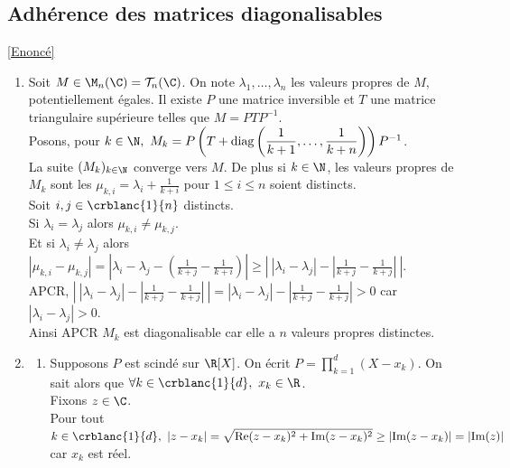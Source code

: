 \documentclass{book}
\begin{document}
	\subsection{Adhérence des matrices diagonalisables }
	\label{sec:adherence-des-matrices-diagonalisables-etoile3}
	\textcolor{blue}{\hyperref[Adhérence des matrices diagonalisables]{[Enoncé]}}\\
	\begin{enumerate}[leftmargin=*]
		\item Soit $M\in \M_n(\C)=\mathcal{T}_n(\C)$. On note $\lambda_1,\dots,\lambda_n$ les valeurs propres de $M$, potentiellement égales. Il existe $P$ une matrice inversible et $T$ une matrice triangulaire supérieure telles que $M=PTP^{-1}$.\\
		Posons, pour $k\in \N,\ M_k=P\left(T+\text{diag}\left(\displaystyle\frac{1}{k+1},\dots,\frac{1}{k+n}\right)\right)P^{-1}$.\\
		La suite $(M_k)_{k\in \N}$ converge vers $M$. De plus si $k\in \N$, les valeurs propres de $M_k$ sont les $\mu_{k,i}=\lambda_i+\displaystyle\frac{1}{k+i}$ pour $1\leq i\leq n$ soient distincts.\\
		Soit $i,j\in \crblanc{1}{n}$ distincts.\\
		Si $\lambda_i=\lambda_j$ alors $\mu_{k,i}\ne \mu_{k,j}$.\\
		Et si $\lambda_i\ne\lambda_j$ alors $|\mu_{k,i}-\mu_{k,j}|=\displaystyle\left|\lambda_i-\lambda_j-\left(\frac{1}{k+j}-\frac{1}{k+i}\right)\right|\geq \left|\ |\lambda_i-\lambda_j|-\left|\frac{1}{k+j}-\frac{1}{k+j}\right|\ \right|$.\\
		APCR, $\displaystyle\left|\ |\lambda_i-\lambda_j|-\left|\frac{1}{k+j}-\frac{1}{k+j}\right|\ \right|=|\lambda_i-\lambda_j|-\left|\frac{1}{k+j}-\frac{1}{k+j}\right|>0$ car $|\lambda_i-\lambda_j|>0$.\\
		Ainsi APCR $M_k$ est diagonalisable car elle a $n$ valeurs propres distinctes.
		\item \begin{enumerate}[label=\alph*.]
			\item Supposons $P$ est scindé sur $\R[X]$. On écrit $P=\displaystyle\prod\limits_{k=1}^d(X-x_k)$. On sait alors que $\forall k\in \crblanc{1}{d},\ x_k\in \R$.\\
			Fixons $z\in \C$.\\
			Pour tout $k\in \crblanc{1}{d},\ |z-x_k|=\displaystyle\sqrt{\text{Re}(z-x_k)^2+\text{Im}(z-x_k)^2}\geq |\text{Im}(z-x_k)|=|\text{Im}(z)|$ car $x_k$ est réel.\\

\end{enumerate}
\end{enumerate}
\end{document}
